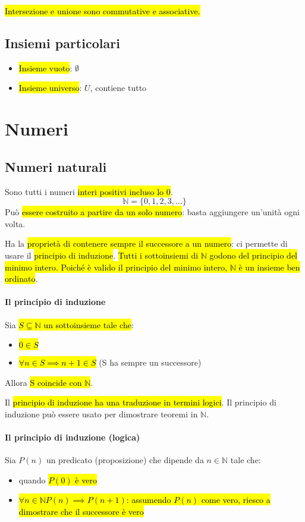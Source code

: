 \documentclass[a4paper,12pt,oneside]{article}
\begin{document}
\hl{Intersezione e unione sono commutative e associative.}

\subsection{Insiemi particolari}
\begin{itemize}
    \item \hl{Insieme vuoto}: $\emptyset$
    \item \hl{Insieme universo}: $U$, contiene tutto
\end{itemize}

\section{Numeri}
\subsection{Numeri naturali}
Sono tutti i numeri \hl{interi positivi incluso lo 0}.
\[
    \mathbb{N} = \{0, 1, 2, 3, \dots \}
\]
Può \hl{essere costruito a partire da un solo numero}: basta aggiungere un'unità
ogni volta.

Ha la \hl{proprietà di contenere sempre il successore a un numero}: ci
permette di usare il \hl{principio di induzione}. \hl{Tutti i sottoinsiemi di 
$\mathbb{N}$ godono del principio del minimo intero. Poiché è valido il 
principio del minimo intero, $\mathbb{N}$ è un insieme ben ordinato}.

\paragraph{Il principio di induzione} Sia \hl{$S \subseteq \mathbb{N}$ un 
sottoinsieme tale che}:
\begin{itemize}
    \item \hl{$0 \in S$}
    \item \hl{$\forall n \in S \implies n+1 \in S$} (S ha sempre un successore)
\end{itemize}

Allora \hl{S coincide con $\mathbb{N}$}.

Il \hl{principio di induzione ha una traduzione in termini logici}. Il
principio di induzione può essere usato per dimostrare teoremi in $\mathbb{N}$.

\paragraph{Il principio di induzione (logica)} Sia $P(n)$ un predicato 
(proposizione) che dipende da $n \in \mathbb{N}$ tale che:
\begin{itemize}
    \item quando \hl{$P(0)$ è vero}
    \item \hl{$\forall n \in \mathbb{N} P(n) \implies P(n+1)$: assumendo $P(n)$ come
        vero, riesco a dimostrare che il successore è vero}
\end{itemize}
\end{document}

